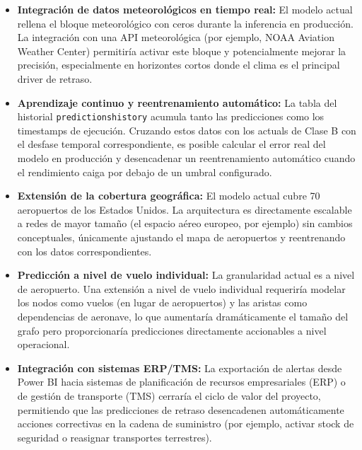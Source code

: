 \documentclass[12pt,oneside,a4paper]{report}
\renewcommand{\_}{\textunderscore\allowbreak}
\begin{document}
\begin{itemize}
    \item \textbf{Integración de datos meteorológicos en tiempo real:} El modelo actual rellena el bloque meteorológico con ceros durante la inferencia en producción. La integración con una API meteorológica (por ejemplo, NOAA Aviation Weather Center) permitiría activar este bloque y potencialmente mejorar la precisión, especialmente en horizontes cortos donde el clima es el principal driver de retraso.
    \item \textbf{Aprendizaje continuo y reentrenamiento automático:} La tabla del historial \texttt{predictions\_history} acumula tanto las predicciones como los timestamps de ejecución. Cruzando estos datos con los actuals de Clase B con el desfase temporal correspondiente, es posible calcular el error real del modelo en producción y desencadenar un reentrenamiento automático cuando el rendimiento caiga por debajo de un umbral configurado.
    \item \textbf{Extensión de la cobertura geográfica:} El modelo actual cubre 70 aeropuertos de los Estados Unidos. La arquitectura es directamente escalable a redes de mayor tamaño (el espacio aéreo europeo, por ejemplo) sin cambios conceptuales, únicamente ajustando el mapa de aeropuertos y reentrenando con los datos correspondientes.
    \item \textbf{Predicción a nivel de vuelo individual:} La granularidad actual es a nivel de aeropuerto. Una extensión a nivel de vuelo individual requeriría modelar los nodos como vuelos (en lugar de aeropuertos) y las aristas como dependencias de aeronave, lo que aumentaría dramáticamente el tamaño del grafo pero proporcionaría predicciones directamente accionables a nivel operacional.
    \item \textbf{Integración con sistemas ERP/TMS:} La exportación de alertas desde Power BI hacia sistemas de planificación de recursos empresariales (ERP) o de gestión de transporte (TMS) cerraría el ciclo de valor del proyecto, permitiendo que las predicciones de retraso desencadenen automáticamente acciones correctivas en la cadena de suministro (por ejemplo, activar stock de seguridad o reasignar transportes terrestres).
\end{itemize}
\end{document}
